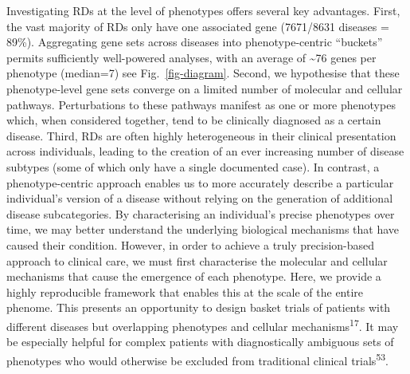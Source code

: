 \documentclass[
sn-nature
]{sn-jnl}
\begin{document}
Investigating RDs at the level of phenotypes offers several key
advantages. First, the vast majority of RDs only have one associated
gene (7671/8631 diseases = 89\%). Aggregating gene sets across diseases
into phenotype-centric ``buckets'' permits sufficiently well-powered
analyses, with an average of \textasciitilde76 genes per phenotype
(median=7) see Fig.~\ref{fig-diagram}. Second, we hypothesise that these
phenotype-level gene sets converge on a limited number of molecular and
cellular pathways. Perturbations to these pathways manifest as one or
more phenotypes which, when considered together, tend to be clinically
diagnosed as a certain disease. Third, RDs are often highly
heterogeneous in their clinical presentation across individuals, leading
to the creation of an ever increasing number of disease subtypes (some
of which only have a single documented case). In contrast, a
phenotype-centric approach enables us to more accurately describe a
particular individual's version of a disease without relying on the
generation of additional disease subcategories. By characterising an
individual's precise phenotypes over time, we may better understand the
underlying biological mechanisms that have caused their condition.
However, in order to achieve a truly precision-based approach to
clinical care, we must first characterise the molecular and cellular
mechanisms that cause the emergence of each phenotype. Here, we provide
a highly reproducible framework that enables this at the scale of the
entire phenome. This presents an opportunity to design basket trials of
patients with different diseases but overlapping phenotypes and cellular
mechanisms\textsuperscript{17}. It may be especially helpful for complex
patients with diagnostically ambiguous sets of phenotypes who would
otherwise be excluded from traditional clinical
trials\textsuperscript{53}.
\end{document}
